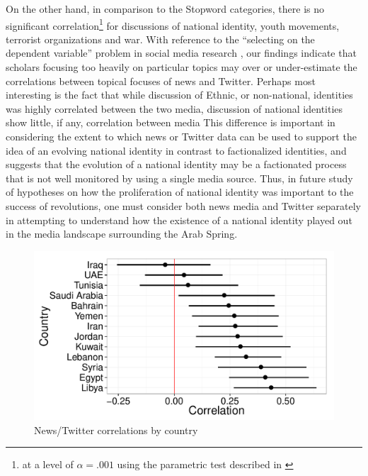 On the other hand, in comparison to the Stopword categories,  there is no significant correlation\footnote{at a level of $\alpha=.001$ using the parametric test described in \citep{zou_toward_2007}} for discussions of national identity, youth movements, terrorist organizations and war.  With reference to the ``selecting on the dependent variable'' problem in social media research \citep{tufekci_big_2014}, our findings indicate that scholars focusing too heavily on particular topics may over or under-estimate the correlations between topical focuses of news and Twitter.  Perhaps most interesting is the fact that while discussion of Ethnic, or non-national, identities was highly correlated between the two media, discussion of national identities show little, if any, correlation between media  This difference is important in considering the extent to which news or Twitter data can be used to support the idea of an evolving national identity in contrast to factionalized identities, and suggests that the evolution of a national identity may be a factionated process that is not well monitored by using a single media source. Thus, in future study of  hypotheses on how the proliferation of national identity was important to the success of revolutions, one must consider both news media and Twitter separately in attempting to understand how the existence of a national identity played out in the media landscape surrounding the Arab Spring.   

\begin{figure}
	\centering
	\includegraphics[width=.5\textwidth]{imgs/country_corr}
	\caption{News/Twitter correlations by country}
	\label{fig:corr_country}
\end{figure}

